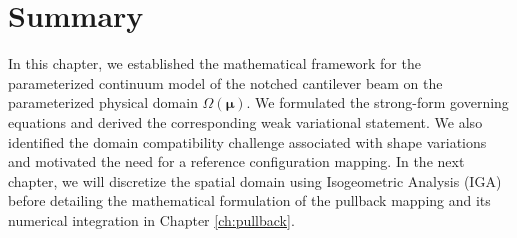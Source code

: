 \section{Summary}
In this chapter, we established the mathematical framework for the parameterized continuum model of the notched cantilever beam on the parameterized physical domain $\Omega(\boldsymbol{\mu})$. We formulated the strong-form governing equations and derived the corresponding weak variational statement. We also identified the domain compatibility challenge associated with shape variations and motivated the need for a reference configuration mapping. In the next chapter, we will discretize the spatial domain using Isogeometric Analysis (IGA) before detailing the mathematical formulation of the pullback mapping and its numerical integration in Chapter \ref{ch:pullback}.
